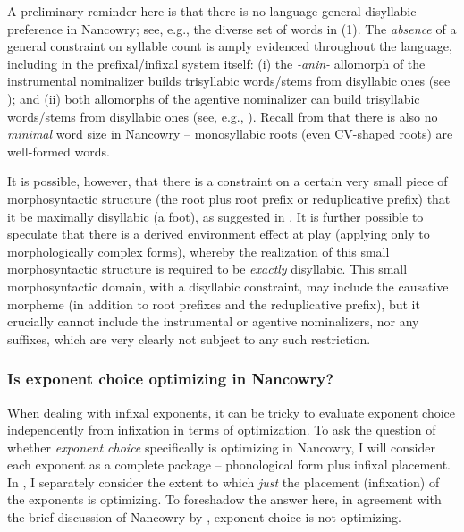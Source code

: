 \documentclass[output=paper]{langscibook}
\begin{document}
A preliminary reminder here is that there is no language-general disyllabic preference in Nancowry; see, e.g., the diverse set of words in (1). The {\it absence} of a general constraint on syllable count is amply evidenced throughout the language, including in the prefixal/infixal system itself: (i) the \textit{-anin-} allomorph of the instrumental nominalizer builds trisyllabic words/stems from disyllabic ones (see ); and (ii) both allomorphs of the agentive nominalizer can build trisyllabic words/stems from disyllabic ones (see, e.g., ). Recall from  that there is also no {\it minimal} word size in Nancowry -- monosyllabic roots (even CV-shaped roots) are well-formed words. 

It is possible, however,  that there is a constraint on a certain very small piece of morphosyntactic structure (the root plus root prefix or reduplicative prefix) that it be maximally disyllabic (a foot), as suggested in . It is further possible to speculate that there is a derived environment effect at play (applying only to morphologically complex forms),  whereby the realization of this small  morphosyntactic structure is required to be {\it exactly} disyllabic. This small morphosyntactic domain, with a disyllabic constraint, may include the causative morpheme (in addition to root prefixes and the reduplicative prefix), but it crucially cannot include the instrumental or agentive nominalizers, nor any suffixes, which are very clearly not subject to any such restriction.


\subsubsection{Is exponent choice optimizing in Nancowry?}\label{sec:kalin:4.3.1}

When dealing with infixal exponents, it can be tricky to evaluate exponent choice independently from infixation in terms of optimization. To ask the question of whether {\it exponent choice} specifically is optimizing in Nancowry, I will consider each exponent as a complete package -- phonological form plus infixal placement. In , I separately consider the extent to which {\it just} the placement (infixation) of the exponents is optimizing. To foreshadow the answer here, in agreement with the brief discussion of Nancowry by \citet[167--168]{Paster06}, exponent choice is not optimizing.
\end{document}
